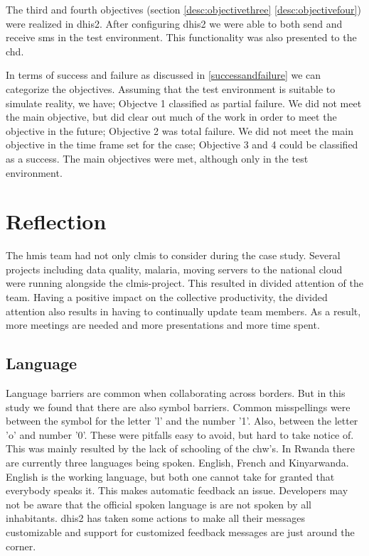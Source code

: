 The third and fourth objectives (section \ref{desc:objectivethree} \ref{desc:objectivefour}) were realized in \gls{dhis2}. After configuring \gls{dhis2} we were able to both send and receive \gls{sms} in the test environment. This functionality was also presented to the \gls{chd}.

In terms of success and failure as discussed in \ref{successandfailure} we can categorize the objectives. Assuming that the test environment is suitable to simulate reality, we have; Objectve 1 classified as partial failure. We did not meet the main objective, but did clear out much of the work in order to meet the objective in the future; Objective 2 was total failure. We did not meet the main objective in the time frame set for the case; Objective 3 and 4 could be classified as a success. The main objectives were met, although only in the test environment. 



\section{Reflection}
The \gls{hmis} team had not only \gls{clmis} to consider during the case study.
Several projects including data quality, malaria, moving servers to the national cloud were running alongside the \gls{clmis}-project. This resulted in divided attention of the team.
Having a positive impact on the collective productivity, the divided attention also results in having to continually update team members. As a result, more meetings are needed and more presentations and more time spent. 
\subsection{Language}
Language barriers are common when collaborating across borders. But in this study we found that there are also symbol barriers.
Common misspellings were between the symbol for the letter 'l' and the number '1'.
Also, between the letter 'o' and number '0'. 
These were pitfalls easy to avoid, but hard to take notice of.
This was mainly resulted by the lack of schooling of the \gls{chw}'s. 
In Rwanda there are currently three languages being spoken. English, French and Kinyarwanda.
English is the working language, but both one cannot take for granted that everybody speaks it.
This makes automatic feedback an issue. Developers may not be aware that the official spoken language is are not spoken by all inhabitants.
\gls{dhis2} has taken some actions to make all their messages customizable and support for customized feedback messages are just around the corner.

